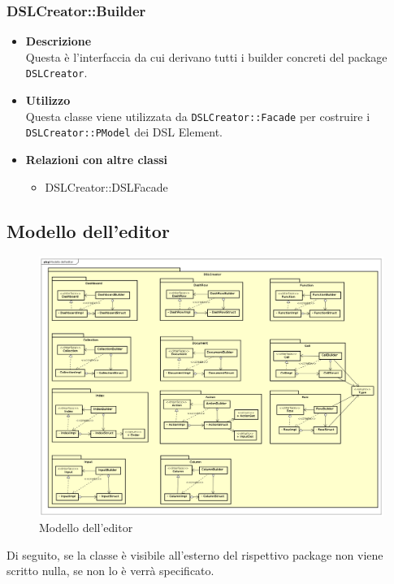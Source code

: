         \subsubsection{DSLCreator::Builder}
        \begin{itemize}
        \item \textbf{Descrizione} \hfill \\
          Questa è l'interfaccia da cui derivano tutti i builder concreti del package \texttt{DSLCreator}.
        \item \textbf{Utilizzo}  \hfill \\
          Questa classe viene utilizzata da \texttt{DSLCreator::Facade} per costruire i \texttt{DSLCreator::PModel} dei DSL Element.
        \item \textbf{Relazioni con altre classi} \hfill 
          \begin{itemize}
          \item DSLCreator::DSLFacade
          \end{itemize}
        \end{itemize}

        \subsection{Modello dell'editor}
        \begin{figure}[H]
          \centering
          \includegraphics[width=1.1\textwidth]{res/img/Diagram_Model.png}
          \caption{Modello dell'editor}
          \label{fig:diagram_model}
        \end{figure}
        Di seguito, se la classe è visibile all'esterno del rispettivo package non viene scritto nulla, se non lo è verrà specificato.
